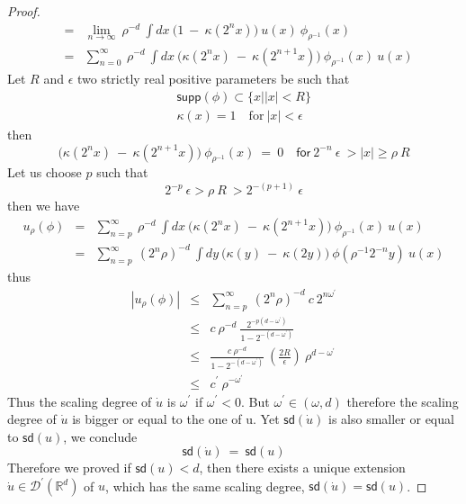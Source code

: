 \documentclass[10pt]{book}
\newcommand{\supp}{\mathsf{supp}}
\newcommand{\sd}{\mathsf{sd}}
\newcommand{\abs}[1]{\left|#1\right|}
\let\int\int
\newcommand{\Dcal}{\mathcal{D}}
\newcommand{\Rbb}{\mathbb{R}}
\theoremstyle{break}
\begin{document}
\begin{proof}
\begin{eqnarray*}
  &=& \lim_{n \to \infty} \ \rho^{-d} \ \int dx \ \bigg( 1 \ - \ \kappa(2^n x) \bigg) \ u(x) \ \phi_{\rho^{-1}}(x) \\
  &=& \sum_{n=0}^{\infty} \ \rho^{-d} \ \int dx \ \bigg( \kappa(2^n x) \ - \ \kappa(2^{n+1} x) \bigg) \ \phi_{\rho^{-1}}(x) \ u(x) 
 \end{eqnarray*}
 Let $R$ and $\epsilon$ two strictly real positive parameters be such that 
 \begin{eqnarray*}
  && \supp(\phi) \subset \{ x | \abs{x} < R \} \\
  && \kappa(x) = 1 \quad \text{for} \ \abs{x} < \epsilon
 \end{eqnarray*}
 then
 \begin{equation*}
  \bigg( \kappa(2^n x) \ - \ \kappa(2^{n+1} x) \bigg) \ \phi_{\rho^{-1}}(x) \ = \ 0 \quad \mathsf{for} \ 2^{-n} \ \epsilon \ > \abs{x} \geq \rho \ R
 \end{equation*}
 Let us choose $p$ such that 
 \begin{equation*}
  2^{-p} \ \epsilon > \rho \ R \ > 2^{-(p+1)} \ \epsilon
 \end{equation*}
 then we have
 \begin{eqnarray*}
  u_\rho(\phi) &=& \sum_{n=p}^{\infty} \ \rho^{-d} \ \int dx \ \bigg( \kappa(2^n x) \ - \ \kappa(2^{n+1} x) \bigg) \ \phi_{\rho^{-1}}(x) \ u(x) \\
  &=& \sum_{n=p}^{\infty} \ (2^n\rho)^{-d} \ \int dy \ \bigg( \kappa(y) \ - \ \kappa(2 y) \bigg) \ \phi(\rho^{-1}2^{-n}y) \ u(x) 
 \end{eqnarray*}
 thus
 \begin{eqnarray*}
  \abs{u_\rho(\phi)} &\leq& \sum_{n=p}^{\infty} \ (2^n\rho)^{-d} \ c \ 2^{n\omega^\prime} \\
  &\leq& c \ \rho^{-d} \ \frac{2^{-p(d-\omega^\prime)}}{1 - 2^{-(d-\omega^\prime)}} \\
  &\leq& \frac{c \ \rho^{-d}}{1 - 2^{-(d-\omega^\prime)}} \ \left( \frac{2R}{\epsilon} \right) \ \rho^{d-\omega^\prime} \\
  &\leq& c^\prime \ \rho^{-\omega^\prime}
 \end{eqnarray*}
 Thus the scaling degree of $\dot{u}$ is $\omega^\prime$ if $\omega^\prime < 0$. But $\omega^\prime \in (\omega,d)$ therefore the scaling degree of $\dot{u}$ is bigger or equal to the one of u. Yet $\sd(\dot{u})$ is also smaller or equal to $\sd(u)$, we conclude 
 \begin{equation*}
  \sd(\dot{u}) \ = \ \sd(u)  
 \end{equation*}
 Therefore we proved if $\sd(u)<d$, then there exists a unique extension $\dot{u} \in \Dcal^\prime(\Rbb^d)$ of $u$, which has the same scaling degree, $\sd(\dot{u})=\sd(u)$. 
 

\end{proof}
\end{document}
